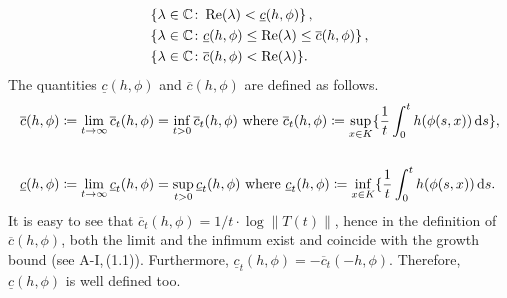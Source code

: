 \begin{equation}\label{eq:b3-4.3}
	\begin{aligned}
		&\{\lambda \in \mathbb{C} \colon \mathop{}\!\mathrm{Re}(\lambda) < \underline{c}(h,\phi)\}\,, \\
		&\{\lambda \in \mathbb{C} \colon \underline{c}(h,\phi) \leq \mathop{}\!\mathrm{Re}(\lambda) \leq \overline{c}(h,\phi)\}\,, \\
		&\{\lambda \in \mathbb{C} \colon \overline{c}(h,\phi) < \mathop{}\!\mathrm{Re}(\lambda)\}.
	\end{aligned}
\end{equation}
The quantities $\underline{c}(h,\phi)$ and $\overline{c}(h,\phi)$ are defined as follows.
\begin{align}\label{eq:b3-4.4}
		&\overline{c}(h,\phi) \coloneq \lim_{t\to\infty} \overline{c}_{t}(h,\phi) = \inf_{t>0} \overline{c}_{t}(h,\phi) \text{ where } 
		\overline{c}_{t}(h,\phi) \coloneq \sup_{x\in K} \{\frac{1}{t}\int_{0}^{t} h(\phi(s,x)) \mathop{}\!\mathrm{d}{s} \},\notag
        \\& \\ \notag
		&\underline{c}(h,\phi) \coloneq \lim_{t\to\infty} \underline{c}_{t}(h,\phi) = \sup_{t>0} \underline{c}_{t}(h,\phi) \text{ where } 
		\underline{c}_{t}(h,\phi) \coloneq \inf_{x\in K} \{\frac{1}{t}\int_{0}^{t} h(\phi(s,x)) \mathop{}\!\mathrm{d}{s}.
\end{align}
It is easy to see that $\overline{c}_{t}(h,\phi) = 1/t\cdot\log\|T(t)\|$, hence in the definition of $\overline{c}(h,\phi)$, both the limit and the infimum exist and coincide with the growth bound (see A-I,\,(1.1)).
Furthermore, $\underline{c}_{t}(h,\phi) = -\overline{c}_{t}(-h,\phi)$.
Therefore, $\underline{c}(h,\phi)$ is well defined too.

